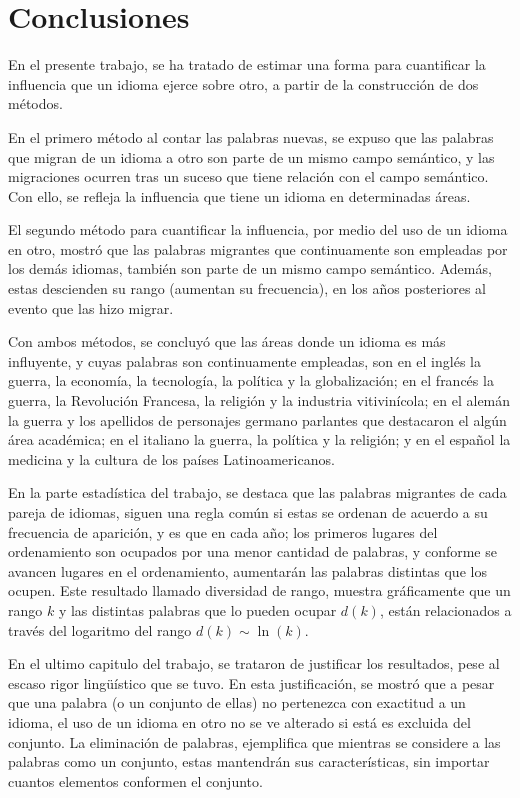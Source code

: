 \chapter{Conclusiones}


En el presente trabajo, se ha tratado de estimar una forma para cuantificar la influencia que un idioma ejerce sobre otro,  a partir de la construcción de dos métodos. 

En el primero método al contar las palabras nuevas, se expuso que las palabras que migran de un idioma a otro son parte de un mismo campo semántico, y las migraciones ocurren tras un suceso que tiene relación con el campo semántico. Con ello, se refleja la influencia que tiene un idioma en determinadas áreas.  

El segundo método para cuantificar la influencia, por medio del uso de un idioma en otro, mostró que las palabras migrantes que continuamente son empleadas por los demás idiomas, también son parte de un mismo campo semántico. Además, estas descienden su rango (aumentan su frecuencia), en los años posteriores al evento que las hizo migrar. 

Con ambos métodos, se concluyó que las áreas donde un idioma es más influyente, y cuyas palabras son continuamente empleadas, son en el inglés la guerra, la economía, la tecnología, la política y la globalización; en el francés la guerra, la Revolución Francesa, la religión y la industria vitivinícola; en el alemán la guerra y los apellidos de personajes germano parlantes que destacaron el algún área académica; en el italiano  la guerra, la política y la religión; y en el español la medicina y la cultura de los países Latinoamericanos. 


En la parte estadística del trabajo, se destaca que las palabras migrantes de cada pareja de idiomas, siguen una regla común si estas se ordenan de acuerdo a su frecuencia de aparición,  y es que en cada año; los primeros lugares del ordenamiento son ocupados por una menor cantidad de palabras, y conforme se avancen lugares en el ordenamiento, aumentarán las palabras distintas que los ocupen. Este resultado llamado diversidad de rango, muestra gráficamente que un rango $k$ y las distintas palabras que lo pueden ocupar $d(k)$, están relacionados a través del logaritmo del rango $d(k)\sim \ln(k)$.

En el ultimo capitulo del trabajo, se trataron de justificar los resultados, pese al escaso rigor lingüístico que se tuvo. En esta justificación, se mostró que a pesar que una palabra (o un conjunto de ellas) no pertenezca con exactitud a un idioma,  el uso de un idioma en otro no se ve alterado si está es excluida del conjunto. La eliminación de palabras, ejemplifica que mientras se considere a las palabras como un conjunto,  estas mantendrán sus características, sin importar cuantos elementos conformen el conjunto. 





